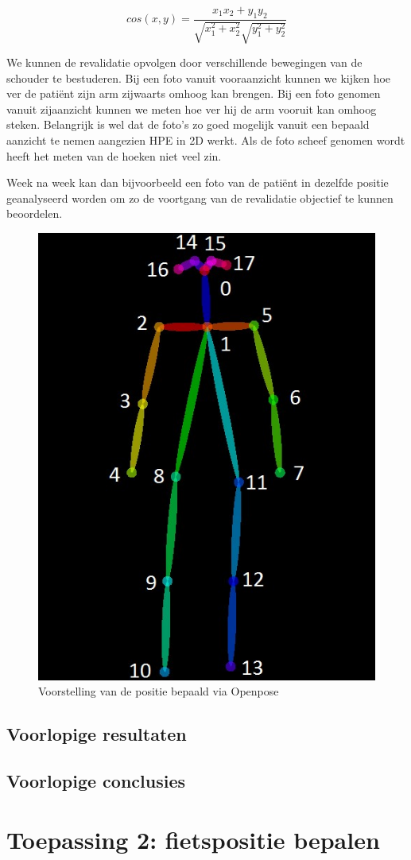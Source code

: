 \documentclass{article}
\begin{document}
\begin{equation}
	cos(x,y) = \frac{x_1x_2+y_1y_2}{\sqrt{x_1^2+x_2^2} \sqrt{y_1^2+y_2^2}}
	\label{eq:cos}
\end{equation}

We kunnen de revalidatie opvolgen door verschillende bewegingen van de schouder te bestuderen. Bij een foto vanuit vooraanzicht kunnen we kijken hoe ver de patiënt zijn arm zijwaarts omhoog kan brengen. Bij een foto genomen vanuit zijaanzicht kunnen we meten hoe ver hij de arm vooruit kan omhoog steken. Belangrijk is wel dat de foto's zo goed mogelijk vanuit een bepaald aanzicht te nemen aangezien HPE in 2D werkt. Als de foto scheef genomen wordt heeft het meten van de hoeken niet veel zin.

Week na week kan dan bijvoorbeeld een foto van de patiënt in dezelfde positie geanalyseerd worden om zo de voortgang van de revalidatie objectief te kunnen beoordelen. 

\begin{figure}[H]
	\centering
	\caption{Voorstelling van de positie bepaald via Openpose}
	\label{fig:skelet}
	\includegraphics[width=.5\textwidth]{HPE_skelet}
\end{figure}


	\subsection{Voorlopige resultaten}

	\subsection{Voorlopige conclusies}

\section{Toepassing 2: fietspositie bepalen}
\end{document}
